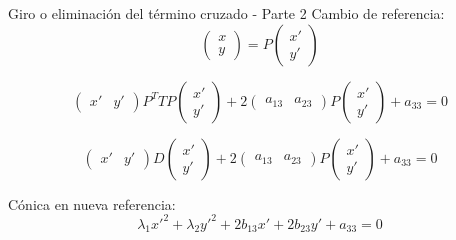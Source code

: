 \documentclass[xcolor={dvipsnames},aspectratio=169,10pt]{beamer}
\begin{document}
\begin{frame}{Giro o eliminación del término cruzado - Parte 2}
  Cambio de referencia:
  \begin{equation*}
    \begin{pmatrix} x \\ y \end{pmatrix} = P \begin{pmatrix} x' \\ y' \end{pmatrix}
  \end{equation*}

  \begin{equation*}
    \begin{pmatrix} x' & y' \end{pmatrix} P^T T P \begin{pmatrix} x' \\ y' \end{pmatrix} + 2\begin{pmatrix} a_{13} & a_{23} \end{pmatrix} P \begin{pmatrix} x' \\ y' \end{pmatrix} + a_{33} = 0
  \end{equation*}
  
  \begin{equation*}
    \begin{pmatrix} x' & y' \end{pmatrix} D \begin{pmatrix} x' \\ y' \end{pmatrix} + 2\begin{pmatrix} a_{13} & a_{23} \end{pmatrix} P \begin{pmatrix} x' \\ y' \end{pmatrix} + a_{33} = 0
  \end{equation*}

  Cónica en nueva referencia:
  \begin{equation*}
    \boxed{\lambda_1x'^2 + \lambda_2y'^2 + 2b_{13}x' + 2b_{23}y' + a_{33} = 0}
  \end{equation*}
\end{frame}
\end{document}
